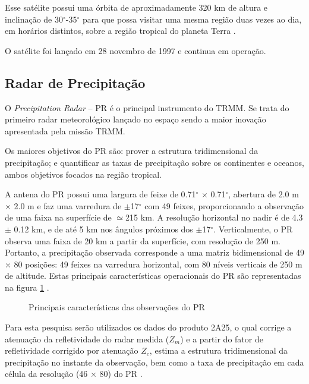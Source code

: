 Esse satélite possui uma órbita de aproximadamente 320 km de altura e inclinação de 30$^{\circ}$-35$^{\circ}$ para que possa visitar uma mesma região duas vezes ao dia, em horários distintos, sobre a região tropical do planeta Terra \cite{simpson1988}.  

O satélite foi lançado em 28 novembro de 1997 e continua em operação.
 

\subsection{Radar de Precipitação}

O \textit{Precipitation Radar} -- PR é o principal instrumento do TRMM. Se trata do primeiro radar meteorológico lançado no espaço sendo a maior inovação apresentada pela missão TRMM. 

Os maiores objetivos do PR são: prover a estrutura tridimensional da precipitação; e quantificar as taxas de precipitação sobre os continentes e oceanos, ambos objetivos focados na região tropical. 

A antena do PR possui uma largura de feixe de 0.71$^{\circ}$ $\times$ 0.71$^{\circ}$, abertura de 2.0 m $\times$ 2.0 m e faz uma varredura de $\pm$17$^{\circ}$ com 49 feixes, proporcionando a observação de uma faixa na superfície de $\simeq$215 km. A resolução horizontal no nadir é de 4.3 $\pm$ 0.12 km, e de até 5 km nos ângulos próximos dos $\pm$17$^{\circ}$. Verticalmente, o PR observa uma faixa de 20 km a partir da superfície, com resolução de 250 m. Portanto, a precipitação observada corresponde a uma matriz bidimensional de 49 $\times$ 80 posições: 49 feixes na varredura horizontal, com 80 níveis verticais de 250 m de altitude. Estas principais características operacionais do PR são representadas na figura \ref{prtrmm} \cite{kummerok1998}.

\begin{figure}[!hb]
\caption{Principais características das observações do PR \cite{trmmhandbook}}
\label{prtrmm} 
\end{figure} 

Para esta pesquisa serão utilizados os dados do produto 2A25, o qual corrige a atenuação da refletividade do radar medida ($Z_m$)  e a partir do fator de refletividade corrigido por atenuação $Z_c$, estima a estrutura tridimensional da precipitação no instante da observação, bem como a taxa de precipitação em cada célula da resolução (46 $\times$ 80) do PR \cite{PRv7}. 

